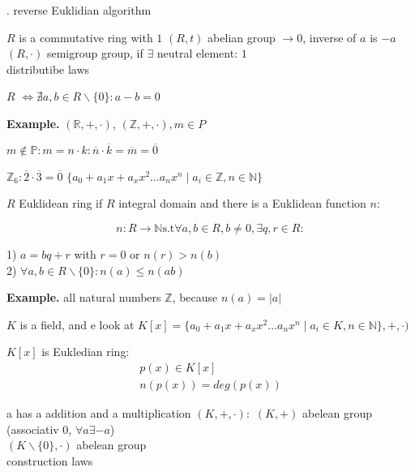 \Proof.
reverse Euklidian algorithm


\begin{definition}
$R$ is a commutative ring with $1$
$(R,t)$ abelian group $\rightarrow 0$, inverse of $a$ is $-a$\\
$(R,\cdot)$ semigroup group, if $\exists$ neutral element: $1$ \\
distributibe laws

$R$  $\iff \nexists a,b \in R \backslash \{0\}: a-b = 0$
\end{definition}

\textbf{Example.}
$(\mathbb{R}, +, \cdot)$, 
$(\mathbb{Z}, + , \cdot), m \in P$

$m\not\in \mathbb{P}: m = n \cdot k : \overline{n} \cdot \overline{k} = \overline{m} = \overline{0}$

$\mathbb{Z}_6 : \overline{2} \cdot \overline{3} = \overline{0}$
$\{a_0 + a_1 x + a_x x^2 \ldots a_n x^n \mid a_i \in \mathbb{Z}, n \in \mathbb{N} \}$

\begin{definition}
$R$ Euklidean ring if $R$ integral domain and there is a Euklidean function $n$:

\[
  n : R \rightarrow \mathbb{N} \text{s.t} \forall a,b \in R, b \neq 0, \exists q,r \in R:
\]

1) $a = bq + r$ with $r = 0$ or $n(r) > n(b)$ \\
2) $\forall a,b \in R \backslash \{0\} : n(a) \leq n(ab)$
\end{definition}

\textbf{Example.}
all natural numbers $\mathbb{Z}$, because $n(a) = |a|$

$K$ is a field, and e look at $K[x] = 
\{a_0 + a_1 x + a_x x^2 \ldots a_n x^n \mid a_i \in K, n \in \mathbb{N} \}
,+, \cdot )$

$K[x]$ is Eukledian ring:
\begin{align*}
  p(x) \in K[x] \\
  n(p(x)) = deg(p(x))
\end{align*}

\begin{definition}
a  has a addition and a multiplication
$(K, +, \cdot):$ 
  $(K,+)$ abelean group (associativ 0, $\forall a \exists -a$) \\
  $(K \backslash \{0\}, \cdot)$ abelean group \\
  construction laws
\end{definition}

